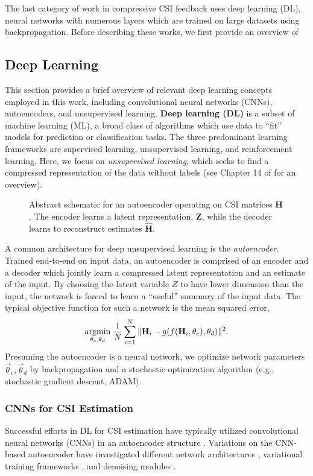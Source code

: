 The last category of work in compressive CSI feedback uses deep learning (DL), neural networks with numerous layers which are trained on large datasets using backpropagation. Before describing these works, we first provide an overview of 

\subsection{Deep Learning}
\label{sect:dl_overview}

This section provides a brief overview of relevant deep learning concepts employed in this work, including convolutional neural networks (CNNs), autoencoders, and unsupervised learning. \textbf{Deep learning (DL)} is a subset of machine learning (ML), a broad class of algorithms which use data to ``fit'' models for prediction or classification tasks. The three predominant learning frameworks are supervised learning, unsupervised learning, and reinforcement learning. Here, we focus on \emph{unsupervised learning}, which seeks to find a compressed representation of the data without labels (see Chapter 14 of \cite{ref:Hastie2016Elements} for an overview).

\begin{figure}[!hbtp]
\centering
\def\svgwidth{0.8\columnwidth}

\caption{Abstract schematic for an autoencoder operating on CSI matrices $\mathbf H$. The encoder learns a latent representation, $\mathbf Z$, while the decoder learns to reconstruct estimates $\hat{\mathbf H}$.}
\label{fig:autoencoder_schematic}
\end{figure}

A common architecture for deep unsupervised learning is the \emph{autoencoder}. Trained end-to-end on input data, an autoencoder is comprised of an encoder and a decoder which jointly learn a compressed latent representation and an estimate of the input. By choosing the latent variable $Z$ to have lower dimension than the input, the network is forced to learn a ``useful'' summary of the input data. The typical objective function for such a network is the mean squared error,
\begin{align*}
\underset{\theta_e, \theta_d}{\text{argmin}}\; \frac 1N \sum_{i=1}^N\Arrowvert \mathbf H_i - g(f(\mathbf H_i, \theta_e), \theta_d) \Arrowvert^2.
\end{align*}
Presuming the autoencoder is a neural network, we optimize network parameters $\vec \theta_e, \vec \theta_d$ by backpropagation and a stochastic optimization algorithm (e.g., stochastic gradient descent, ADAM).

\subsubsection{CNNs for CSI Estimation}
\label{sect:dl_csi}

Successful efforts in DL for CSI estimation have typically utilized convolutional neural networks (CNNs) in an autoencoder structure \cite{ref:csinet}. Variations on the CNN-based autoencoder have investigated different network architectures \cite{ref:Lu2020CRNet}, variational training frameworks \cite{ref:Hussien2020PRVNet}, and denoising modules \cite{ref:Sun2020AnciNet}.
